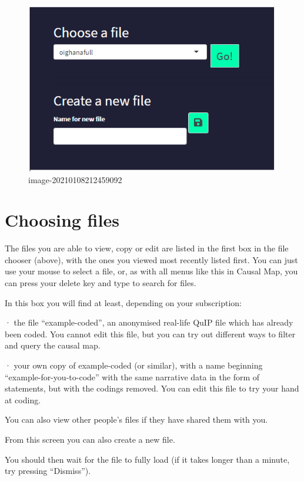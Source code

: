 \documentclass[
]{book}
\begin{document}
\begin{figure}
\centering
\includegraphics{_assets/image-20210108212459092.png}
\caption{image-20210108212459092}
\end{figure}

\hypertarget{choosing-files}{%
\section{Choosing files}\label{choosing-files}}

The files you are able to view, copy or edit are listed in the first box in the file chooser (above), with the ones you viewed most recently listed first. You can just use your mouse to select a file, or, as with all menus like this in Causal Map, you can press your delete key and type to search for files.

In this box you will find at least, depending on your subscription:

· the file ``example-coded'', an anonymised real-life QuIP file which has already been coded. You cannot edit this file, but you can try out different ways to filter and query the causal map.

· your own copy of example-coded (or similar), with a name beginning ``example-for-you-to-code'' with the same narrative data in the form of statements, but with the codings removed. You can edit this file to try your hand at coding.

You can also view other people's files if they have shared them with you.

From this screen you can also create a new file.

You should then wait for the file to fully load (if it takes longer than a minute, try pressing ``Dismiss'').
\end{document}

